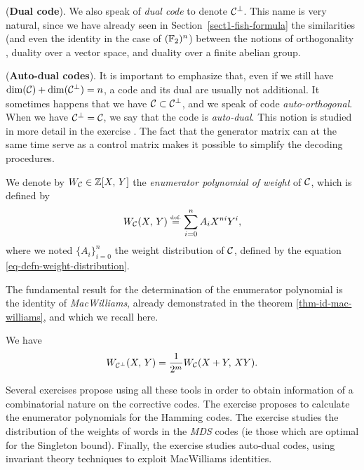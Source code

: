  
\begin{rem}{(\upshape \textbf{Dual code}).}
  We also speak of \textit{dual code} to denote $ \mathcal{C}^\bot $. This name is very natural, since we have already seen in Section~\ref{sect1-fish-formula} the similarities (and even the identity in the case of $ (\mathbb{F}_2)^n $) between the notions of orthogonality , duality over a vector space, and duality over a finite abelian group.
\end{rem}
 
 
\begin{rem}{(\upshape \textbf{Auto-dual codes}).}
   It is important to emphasize that, even if we still have $ \dim (\mathcal{C}) + \dim (\mathcal{C}^\bot) = n $, a code and its dual are usually not additional. It sometimes happens that we have $ \mathcal{C} \subset \mathcal{C}^\bot $, and we speak of code \textit{auto-orthogonal}. When we have $ \mathcal{C}^\bot = \mathcal{C} $, we say that the code is \textit{auto-dual}. This notion is studied in more detail in the exercise . The fact that the generator matrix can at the same time serve as a control matrix makes it possible to simplify the decoding procedures.
\end{rem}
 
 
\begin{defn}
\label{defn-polynomial-enumerator-code}
 We denote by $ W_{\mathcal{C}} \in \mathbb{Z} [X, \, Y] $ the \textit{enumerator polynomial of weight} of $ \mathcal{C} $, which is defined by
\begin{equation*}
W_{\mathcal{C}} (X, \, Y) \stackrel{\mbox{\upshape\tiny def.}}{=} \sum_{i = 0}^{n}{A_i X^{ni} Y^i},
\end{equation*}
where we noted $ \{A_i\}_{i = 0}^n $ the weight distribution of $ \mathcal{C} $, defined by the equation \eqref{eq-defn-weight-distribution}.
\end{defn}
The fundamental result for the determination of the enumerator polynomial is the identity of \textit{MacWilliams}, already demonstrated in the theorem \ref{thm-id-mac-williams}, and which we recall here.
 
\begin{thm}
\label{thm-id-mac-williams-correctors-codes}
  We have
\begin{equation*}
W_{\mathcal{C}^{\bot}} (X, \, Y) = \frac{1}{2^m} W_{\mathcal{C}} (X + Y, \, XY).
\end{equation*}
\end{thm}
Several exercises propose using all these tools in order to obtain information of a combinatorial nature on the corrective codes. The exercise  proposes to calculate the enumerator polynomials for the Hamming codes. The  exercise studies the distribution of the weights of words in the \textit{MDS} codes (ie those which are optimal for the Singleton bound). Finally, the exercise  studies auto-dual codes, using invariant theory techniques to exploit MacWilliams identities.


